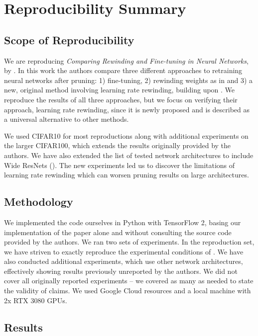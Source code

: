 \section{Reproducibility Summary}

\subsection*{Scope of Reproducibility}
    
We are reproducing \emph{Comparing Rewinding and Fine-tuning in Neural Networks}, by \cite{Renda}.
In this work the authors compare three different approaches to retraining neural networks after pruning: 1) fine-tuning, 2) rewinding weights as in \cite{Frankle} and 3) a new, original method involving learning rate rewinding, building upon \cite{Frankle}. We reproduce the results of all three approaches, but we focus on verifying their approach, learning rate rewinding, since it is newly proposed and is described as a universal alternative to other methods.

We used CIFAR10 for most reproductions along with additional experiments on the larger CIFAR100, which extends the results originally provided by the authors. We have also extended the list of tested network architectures to include Wide ResNets (\cite{wrn}). The new experiments led us to discover the limitations of learning rate rewinding which can worsen pruning results on large architectures.

\subsection*{Methodology}

We implemented the code ourselves in Python with TensorFlow 2, basing our implementation of the paper alone and without consulting the source code provided by the authors. We ran two sets of experiments. In the reproduction set, we have striven to exactly reproduce the experimental conditions of \cite{Renda}. We have also conducted additional experiments, which use other network architectures, effectively showing results previously unreported by the authors. We did not cover all originally reported experiments -- we covered as many as needed to state the validity of claims. We used Google Cloud resources and a local machine with 2x RTX 3080 GPUs.

\subsection*{Results}

